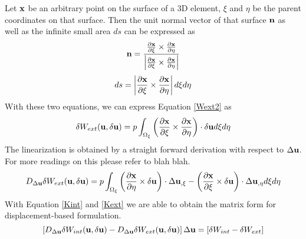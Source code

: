 Let $\bold{x}$ be an arbitrary point on the surface of a 3D element, $\xi$ and $\eta$ be the parent coordinates on that surface. Then the unit normal vector of that surface $\bold{n}$ as well as the infinite small area $ds$ can be expressed as
\begin{equation}
\bold{n} = \frac{  \frac{\partial{\bold{x}}}{\partial{\xi}} \times  \frac{\partial{\bold{x}}}{\partial{\eta}} }{\left| \frac{\partial{\bold{x}}}{\partial{\xi}} \times  \frac{\partial{\bold{x}}}{\partial{\eta}} \right|}
\end{equation}
\begin{equation}
ds = \left|\frac{\partial{\bold{x}}}{\partial{\xi}} \times  \frac{\partial{\bold{x}}}{\partial{\eta}}\right| d\xi{d\eta}
\end{equation}
With these two equations, we can express Equation \ref{Wext2} as
\begin{equation} \label{Kext}
\delta{W_{ext}}(\bold{u}, \delta{\bold{u}}) = p\int_{\Omega_{\xi}}  \left(\frac{\partial{\bold{x}}}{\partial{\xi}} \times  \frac{\partial{\bold{x}}}{\partial{\eta}}\right) \cdot\delta{\bold{u}}d\xi{d\eta}
\end{equation}
The linearization is obtained by a straight forward derivation with respect to $\Delta\bold{u}$. For more readings on this please refer to blah blah.
\begin{equation}
D_{\Delta{\bold{u}}}\delta{W_{ext}}(\bold{u}, \delta{\bold{u}}) =  p\int_{\Omega_{\xi}}  \left(\frac{\partial{\bold{x}}}{\partial{\eta}} \times \delta\bold{u}\right) \cdot\Delta{\bold{u}}_{,\xi} - 
\left(\frac{\partial{\bold{x}}}{\partial{\xi}} \times \delta\bold{u}\right) \cdot\Delta{\bold{u}}_{,\eta} d\xi{d\eta}
\end{equation}
With Equation \ref{Kint} and \ref{Kext} we are able to obtain the matrix form for displacement-based formulation.
\begin{equation} \label{matrix}
\left[ D_{\Delta{\bold{u}}}\delta{W_{int}}(\bold{u}, \delta{\bold{u}}) - D_{\Delta{\bold{u}}}\delta{W_{ext}}(\bold{u}, \delta{\bold{u}}) \right] \Delta\bold{u} = \left[\delta{W_{int}} - \delta{W_{ext}}\right]
\end{equation}



